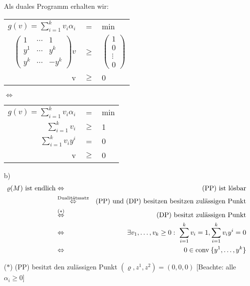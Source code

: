 \documentclass[a4paper,11pt,twoside,titlepage]{article}
\newcommand{\conv}{{\operatorname{conv}\:}}
\begin{document}
Als duales Programm erhalten wir:
\begin{center}
\begin{tabular}{|rcl|}\hline
$g(v)=\sum_{i=1}^kv_i\alpha_i$&=&min\\
$\begin{pmatrix}1&\cdots&1\\y^1&\cdots&y^k\\y^k&\cdots&-y^k\end{pmatrix}
v$&$\geq$&$\begin{pmatrix}1\\0\\\vdots\\0\end{pmatrix}$\\
v&$\geq$&0\\\hline
\end{tabular} $\Leftrightarrow$
\begin{tabular}{|rcl|}\hline
$g(v)=\sum_{i=1}^kv_i\alpha_i$&=&min\\
$\sum_{i=1}^kv_i$&$\geq$&1\\
$\sum_{i=1}^kv_iy^i$&=&0\\
v&$\geq$&0\\\hline
\end{tabular}
\end{center}

b) \begin{eqnarray*}
\varrho(M)\textnormal{ ist endlich}&\Leftrightarrow&\textnormal{(PP) ist lösbar}\\
&\stackrel{\textnormal{\scriptsize{Dualitätssatz}}}{\Leftrightarrow}&\textnormal{(PP) und (DP) besitzen besitzen zulässigen Punkt}\\
&\stackrel{(\ast)}{\Leftrightarrow}&\textnormal{(DP) besitzt zulässigen Punkt}\\
&\Leftrightarrow&\exists v_1,\ldots,v_k\geq0:\ \sum_{i=1}^kv_i=1,\sum_{i=1}^kv_iy^i=0\\
&\Leftrightarrow&0\in \conv\{y^1,\ldots,y^k\}\end{eqnarray*} 

($\ast$) (PP) besitzt den zulässigen Punkt $(\varrho, z^1,z^2)=(0,0,0)$ [Beachte: alle $\alpha_i\geq0$]
\end{document}

